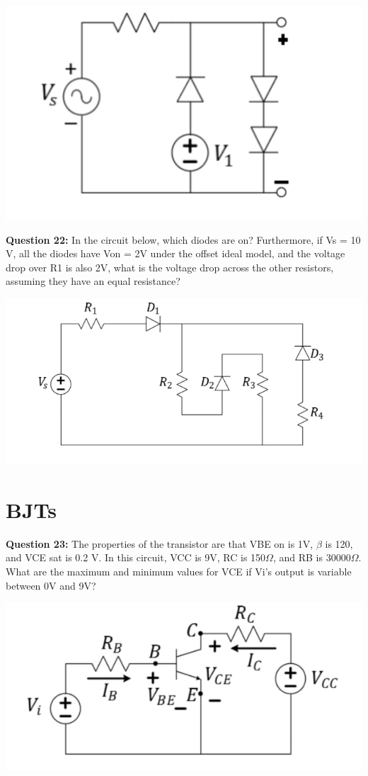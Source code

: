 \documentclass{article}
\begin{document}
\begin{center}

        \includegraphics[width=0.75\linewidth]{figures/45.png}
\end{center}

\textbf{Question 22:} In the circuit below, which diodes are on? Furthermore, if Vs = 10 V, all the diodes have Von = 2V under the offset ideal model, and the voltage drop over R1 is also 2V, what is the voltage drop across the other resistors, assuming they have an equal resistance?

\begin{center}
    \includegraphics[width=0.75\linewidth]{figures/46.png}
\end{center}

\pagebreak

\section*{BJTs}
\textbf{Question 23:} The properties of the transistor are that VBE on is 1V, \(\beta\) is 120, and VCE sat is 0.2 V. In this circuit, VCC is 9V, RC is 150\(\Omega\), and RB is 30000\(\Omega\). What are the maximum and minimum values for VCE if Vi’s output is variable between 0V and 9V?

\begin{center}

    \includegraphics[width=0.75\linewidth]{figures/56.png}
\end{center}
\end{document}

